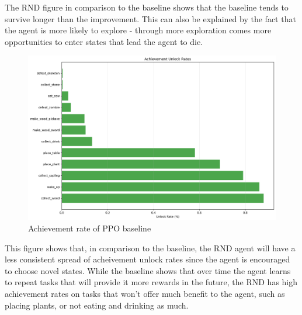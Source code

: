 \documentclass[twocolumn]{article}
\begin{document}
The RND figure in comparison to the baseline shows that the baseline tends to survive longer than the improvement. This can also be explained by the fact that the agent is more likely to explore - through more exploration comes more opportunities to enter states that lead the agent to die.
\begin{figure}[H]
    \centering
    \includegraphics[width=0.75\linewidth]{images/achievement_rates_ppo_improv1_1000_episodes.png}
    \caption{Achievement rate of PPO baseline}
    \label{fig:placeholder}
\end{figure}
This figure shows that, in comparison to the baseline, the RND agent will have a less consistent spread of acheivement unlock rates since the agent is encouraged to choose novel states. While the baseline shows that over time the agent learns to repeat tasks that will provide it more rewards in the future, the RND has high achievement rates on tasks that won't offer much benefit to the agent, such as placing plants, or not eating and drinking as much.
\end{document}

